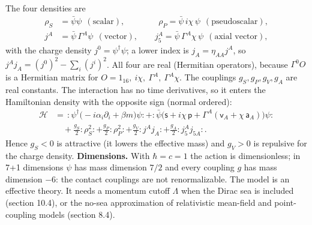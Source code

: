 \documentclass[10pt,a4paper]{article}
\begin{document}
The four densities are
\begin{align*}
\rho_S&=\bar\psi\psi\ \ (\text{scalar}),\qquad\qquad \rho_P=\bar\psi\,i\chi\,\psi\ \ (\text{pseudoscalar}), \\
j^A&=\bar\psi\,\Gamma^A\psi\ \ (\text{vector}),\qquad j_5^A=\bar\psi\,\Gamma^A\chi\,\psi\ \ (\text{axial vector}),
\end{align*}
with the charge density $j^0=\psi^\dagger\psi$; a lower index is $j_A=\eta_{AA}j^A$, so $j^Aj_A=(j^0)^2-\sum_i(j^i)^2$. All four are real (Hermitian operators), because $\Gamma^0O$ is a Hermitian matrix for $O=1_{16},\ i\chi,\ \Gamma^A,\ \Gamma^A\chi$. The couplings $g_S,g_P,g_V,g_A$ are real constants. The interaction has no time derivatives, so it enters the Hamiltonian density with the opposite sign (normal ordered):
\begin{align*}
\mathcal H&=\,:\psi^\dagger\big(-i\alpha_i\partial_i+\beta m\big)\psi:+:\bar\psi\big(\mathsf s+i\chi\,\mathsf p+\Gamma^A(\mathsf v_A+\chi\,\mathsf a_A)\big)\psi: \\
&\quad+\frac{g_S}{2}:\rho_S^2:+\frac{g_P}{2}:\rho_P^2:+\frac{g_V}{2}:j^Aj_A:+\frac{g_A}{2}:j_5^Aj_{5A}: .
\end{align*}
Hence $g_S<0$ is attractive (it lowers the effective mass) and $g_V>0$ is repulsive for the charge density. \textbf{Dimensions.} With $\hbar=c=1$ the action is dimensionless; in 7+1 dimensions $\psi$ has mass dimension $7/2$ and every coupling $g$ has mass dimension $-6$: the contact couplings are not renormalizable. The model is an effective theory. It needs a momentum cutoff $\Lambda$ when the Dirac sea is included (section 10.4), or the no-sea approximation of relativistic mean-field and point-coupling models (section 8.4).
\end{document}
